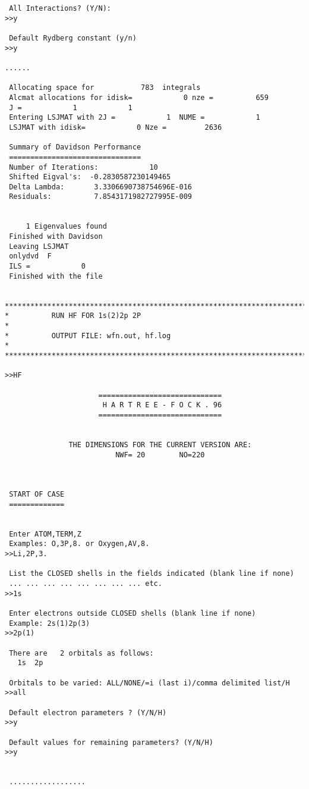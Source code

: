 \documentclass[fleqn,10pt]{book}
\begin{document}
\begin{verbatim}
 All Interactions? (Y/N):
>>y

 Default Rydberg constant (y/n)
>>y

......

 Allocating space for           783  integrals
 Alcmat allocations for idisk=            0 nze =          659
 J =            1            1
 Entering LSJMAT with 2J =            1  NUME =            1
 LSJMAT with idisk=            0 Nze =         2636

 Summary of Davidson Performance
 ===============================
 Number of Iterations:            10
 Shifted Eigval's:  -0.2830587230149465
 Delta Lambda:       3.3306690738754696E-016
 Residuals:          7.8543171982727995E-009


     1 Eigenvalues found
 Finished with Davidson
 Leaving LSJMAT
 onlydvd  F
 ILS =            0
 Finished with the file


*******************************************************************************
*          RUN HF FOR 1s(2)2p 2P                                              *
*          OUTPUT FILE: wfn.out, hf.log                                       *
*******************************************************************************

>>HF

                      =============================
                       H A R T R E E - F O C K . 96
                      =============================


               THE DIMENSIONS FOR THE CURRENT VERSION ARE:
                          NWF= 20        NO=220



 START OF CASE
 =============


 Enter ATOM,TERM,Z
 Examples: O,3P,8. or Oxygen,AV,8.
>>Li,2P,3.

 List the CLOSED shells in the fields indicated (blank line if none)
 ... ... ... ... ... ... ... ... etc.
>>1s

 Enter electrons outside CLOSED shells (blank line if none)
 Example: 2s(1)2p(3)
>>2p(1)

 There are   2 orbitals as follows:
   1s  2p

 Orbitals to be varied: ALL/NONE/=i (last i)/comma delimited list/H
>>all

 Default electron parameters ? (Y/N/H)
>>y

 Default values for remaining parameters? (Y/N/H)
>>y
 
 
 ..................


\end{verbatim}
\end{document}
